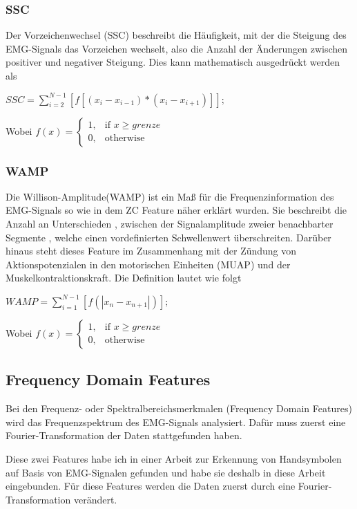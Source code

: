 \subsubsection{SSC}
Der Vorzeichenwechsel (SSC) beschreibt  die Häufigkeit, mit der die Steigung des EMG-Signals das Vorzeichen wechselt, also die Anzahl der Änderungen zwischen positiver und negativer Steigung.
Dies kann mathematisch ausgedrückt werden als

$SSC=\sum_{i=2}^{N-1} \left [ f\left [(x_{i} - x_{i-1}) *  (x_{i} - x_{i+1}) \right] \right ];
$

Wobei $    f(x)= 
\begin{cases}
    1,& \text{if } x\geq grenze\\
    0,              & \text{otherwise}
\end{cases} $


\subsubsection{WAMP}
Die Willison-Amplitude(WAMP) ist ein Maß für die Frequenzinformation des EMG-Signals so wie in dem ZC Feature näher erklärt wurden. Sie beschreibt die Anzahl an Unterschieden ,  zwischen der Signalamplitude zweier benachbarter Segmente , welche einen vordefinierten Schwellenwert überschreiten. Darüber hinaus steht dieses Feature im Zusammenhang mit der Zündung von Aktionspotenzialen in  den motorischen Einheiten (MUAP) und der Muskelkontraktionskraft. Die Definition lautet wie folgt

$WAMP = \sum_{i=1}^{N-1}\left [ f(\left | x_{n} - x_{n+1} \right |) \right ];$



Wobei $    f(x)= 
\begin{cases}
    1,& \text{if } x\geq grenze\\
    0,              & \text{otherwise}
\end{cases} $

\subsection{Frequency Domain Features}
Bei den Frequenz- oder Spektralbereichsmerkmalen (Frequency Domain Features) wird das Frequenzspektrum des EMG-Signals analysiert. Dafür muss zuerst eine Fourier-Transformation der Daten stattgefunden haben. 

Diese zwei Features habe ich in einer Arbeit zur Erkennung von Handsymbolen auf Basis von EMG-Signalen gefunden und habe sie deshalb in diese Arbeit eingebunden. Für diese Features werden die Daten zuerst durch eine Fourier-Transformation verändert. \cite{AidenLee2019-GIT}


